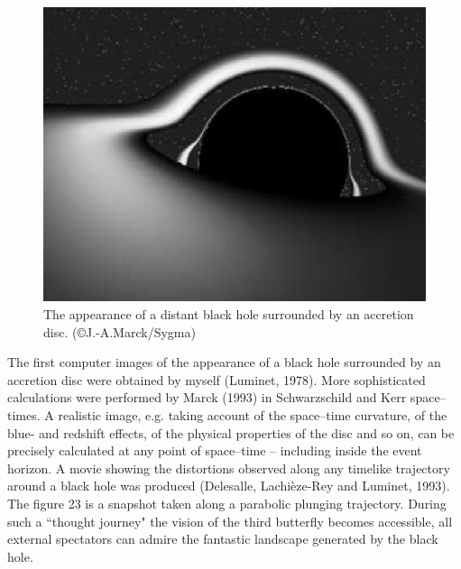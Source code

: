 \documentclass{lamuphys}
\begin{document}
\begin{figure}[ht]
  \begin{center}
    \leavevmode
    \includegraphics{TNM.ps}
    \caption{
The appearance of a distant black hole surrounded by an accretion disc.
(\copyright J.-A.Marck/Sygma)}
  \end{center}
\end{figure}
The first computer images of the appearance of a black hole surrounded 
by an accretion disc were obtained by myself (Luminet, 1978). More 
sophisticated calculations were performed by Marck (1993) in 
Schwarzschild and Kerr space--times. A realistic image, e.g. taking account 
of the space--time curvature, of the blue- and redshift effects, of the physical properties
of the disc and so on, can be precisely calculated 
at any point of space--time -- including inside the event horizon. A movie
showing the distortions observed along any 
timelike trajectory around a black hole was produced (Delesalle, 
Lachi\`eze-Rey and Luminet, 1993). The figure 23 is a snapshot taken along a parabolic 
plunging trajectory. During such a ``thought 
journey" the vision of the third butterfly becomes accessible, all external spectators 
can admire the fantastic landscape generated by the black hole. 
\end{document}
